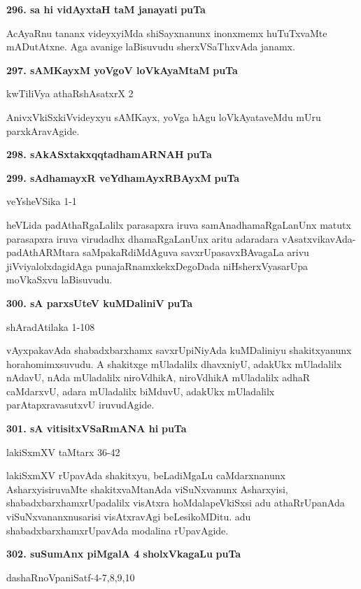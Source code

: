 \noindent
\textbf{296. sa hi vidAyxtaH taM janayati} \hfill {\bf puTa }

\smallskip
AcAyaRnu tananx videyxyiMda shiSayxnanunx inonxmemx huTuTxvaMte mADutAtxne. Aga avanige laBisuvudu sherxVSaThxvAda janamx.

\medskip
\textbf{297. sAMKayxM yoVgoV loVkAyaMtaM} \hfill {\bf puTa }

\hfill kwTiliVya athaRshAsatxrX 2

\smallskip
AnivxVkiSxkiVvideyxyu sAMKayx, yoVga hAgu loVkAyataveMdu mUru parxkAravAgide.

\medskip
\noindent
\textbf{298. sAkASxtakxqqtadhamARNAH} \hfill {\bf puTa }

\smallskip
\noindent
\textbf{299. sAdhamayxR veYdhamAyxRBAyxM}  \hfill {\bf puTa }

\hfill veYsheVSika 1-1

\smallskip
heVLida padAthaRgaLalilx parasapxra iruva samAnadhamaRgaLanUnx matutx parasapxra iruva virudadhx dhamaRgaLanUnx aritu adaradara vAsatxvikavAda-padAthARMtara saMpakaRdiMdAguva savxrUpasavxBAvagaLa arivu jiVviyalolxdagidAga punajaRnamxkekxDegoDada niHsherxVyasarUpa moVkaSxvu laBisuvudu.

\medskip
\noindent
\textbf{300. sA parxsUteV kuMDaliniV} \hfill {\bf puTa }

\hfill shAradAtilaka 1-108

\smallskip
vAyxpakavAda shabadxbarxhamx savxrUpiNiyAda kuMDaliniyu shakitxyanunx horahomimxsuvudu. A shakitxge mUladalilx dhavxniyU, adakUkx mUladalilx nAdavU, nAda mUladalilx niroVdhikA, niroVdhikA mUladalilx adhaR caMdarxvU, adara mUladalilx biMduvU, adakUkx mUladalilx parAtapxravasutxvU iruvudAgide.

\medskip
\noindent
\textbf{301. sA vitisitxVSaRmANA hi} \hfill {\bf puTa }

\hfill lakiSxmXV taMtarx 36-42

\smallskip
lakiSxmXV rUpavAda shakitxyu, beLadiMgaLu caMdarxnanunx AsharxyisiruvaMte shakitxvaMtanAda viSuNxvanunx Asharxyisi, shabadxbarxhamxrUpadalilx visAtxra hoMdalapeVkiSxsi adu athaRrUpanAda viSuNxvananxnusarisi visAtxravAgi beLesikoMDitu. adu shabadxbarxhamxrUpavAda modalina rUpavAgide.

\medskip
\noindent
\textbf{302. suSumAnx piMgalA 4 sholxVkagaLu} \hfill {\bf puTa }

\hfill dashaRnoVpaniSatf-4-7,8,9,10

